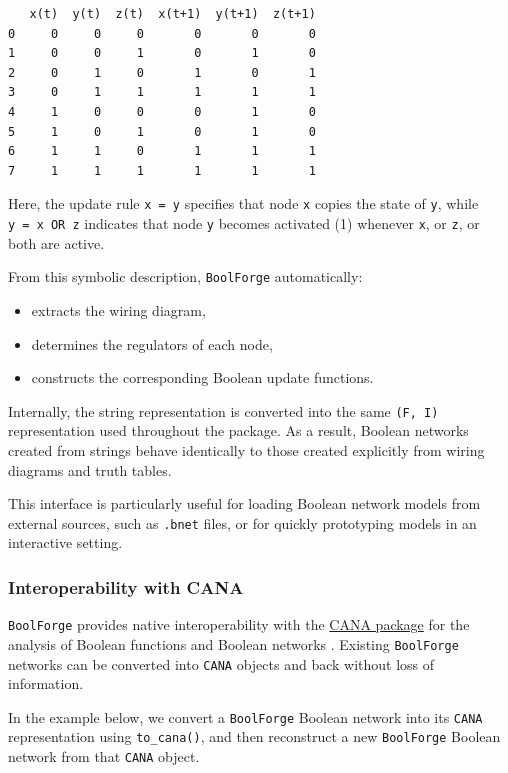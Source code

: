 \documentclass[
]{article}
\providecommand{\tightlist}{%
  \setlength{\itemsep}{0pt}\setlength{\parskip}{0pt}}
\begin{document}
\begin{lstlisting}
   x(t)  y(t)  z(t)  x(t+1)  y(t+1)  z(t+1)
0     0     0     0       0       0       0
1     0     0     1       0       1       0
2     0     1     0       1       0       1
3     0     1     1       1       1       1
4     1     0     0       0       1       0
5     1     0     1       0       1       0
6     1     1     0       1       1       1
7     1     1     1       1       1       1
\end{lstlisting}

Here, the update rule \texttt{x\ =\ y} specifies that node \texttt{x}
copies the state of \texttt{y}, while \texttt{y\ =\ x\ OR\ z} indicates
that node \texttt{y} becomes activated (1) whenever \texttt{x}, or
\texttt{z}, or both are active.

From this symbolic description, \texttt{BoolForge} automatically:

\begin{itemize}
\tightlist
\item
  extracts the wiring diagram,
\item
  determines the regulators of each node,
\item
  constructs the corresponding Boolean update functions.
\end{itemize}

Internally, the string representation is converted into the same
\texttt{(F,\ I)} representation used throughout the package. As a
result, Boolean networks created from strings behave identically to
those created explicitly from wiring diagrams and truth tables.

This interface is particularly useful for loading Boolean network models
from external sources, such as \texttt{.bnet} files, or for quickly
prototyping models in an interactive setting.

\subsubsection{Interoperability with
CANA}\label{interoperability-with-cana}

\texttt{BoolForge} provides native interoperability with the
\href{https://www.github.com/CASCI-lab/CANA}{CANA package} for the
analysis of Boolean functions and Boolean networks
\citep{marcus2025cana}. Existing \texttt{BoolForge} networks can be
converted into \texttt{CANA} objects and back without loss of
information.

In the example below, we convert a \texttt{BoolForge} Boolean network
into its \texttt{CANA} representation using \texttt{to\_cana()}, and
then reconstruct a new \texttt{BoolForge} Boolean network from that
\texttt{CANA} object.
\end{document}
